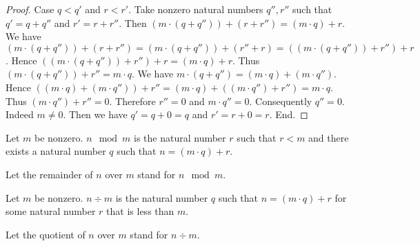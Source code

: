 \documentclass[../../arithmetic.ftl.tex]{subfiles}
\begin{document}
\begin{forthel}
\begin{proof}
      Case $q < q'$ and $r < r'$.
        Take nonzero natural numbers $q'',r''$ such that $q' = q + q''$ and $r' = r + r''$.
        Then $(m \cdot (q + q'')) + (r + r'') = (m \cdot q) + r$.
        We have $(m \cdot (q + q'')) + (r + r'') = (m \cdot (q + q'')) + (r'' + r) = ((m \cdot (q + q'')) + r'') + r$.
        Hence $((m \cdot (q + q'')) + r'') + r = (m \cdot q) + r$.
        Thus $(m \cdot (q + q'')) + r'' = m \cdot q$.
        We have $m \cdot (q + q'') = (m \cdot q) + (m \cdot q'')$.
        Hence $((m \cdot q) + (m \cdot q'')) + r'' = (m \cdot q) + ((m \cdot q'') + r'') = m \cdot q$.
        Thus $(m \cdot q'') + r'' = 0$.
        Therefore $r'' = 0$ and $m \cdot q'' = 0$.
        Consequently $q'' = 0$.
        Indeed $m \neq 0$.
        Then we have $q' = q + 0 = q$  and $r' = r + 0 = r$.
      End.
    \end{proof}

    \begin{definition}
      Let $m$ be nonzero.
      $n \mod m$ is the natural number $r$ such that $r < m$ and there exists a natural number $q$ such that $n = (m \cdot q) + r$.
    \end{definition}

    Let the remainder of $n$ over $m$ stand for $n \mod m$.

    \begin{definition}
      Let $m$ be nonzero.
      $n \div m$ is the natural number $q$ such that $n = (m \cdot q) + r$ for some natural number $r$ that is less than $m$.
    \end{definition}

    Let the quotient of $n$ over $m$ stand for $n \div m$.
  \end{forthel}
\end{document}
